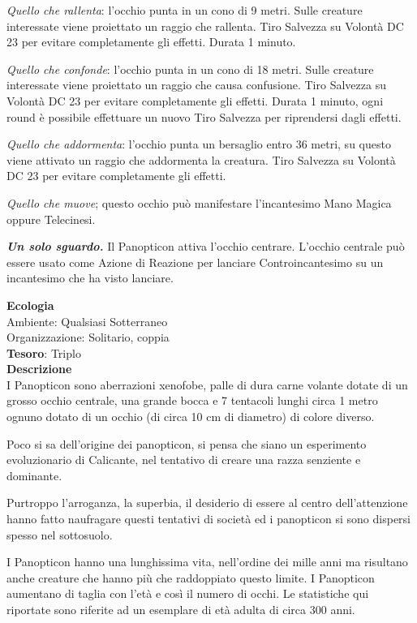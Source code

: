 \begin{multicols}{2}
\textit{Quello che rallenta}: l'occhio punta in un cono di 9 metri. Sulle creature interessate viene proiettato un raggio che rallenta. Tiro Salvezza su Volontà DC 23 per evitare completamente gli effetti. Durata 1 minuto.

\textit{Quello che confonde}: l'occhio punta in un cono di 18 metri. Sulle creature interessate viene proiettato un raggio che causa confusione. Tiro Salvezza su Volontà DC 23 per evitare completamente gli effetti. Durata 1 minuto, ogni round è possibile effettuare un nuovo Tiro Salvezza per riprendersi dagli effetti.

\textit{Quello che addormenta}: l'occhio punta un bersaglio entro 36 metri, su questo viene attivato un raggio che addormenta la creatura. Tiro Salvezza su Volontà DC 23 per evitare completamente gli effetti.

\textit{Quello che muove}; questo occhio può manifestare l'incantesimo Mano Magica oppure Telecinesi.

\textit{\textbf{Un solo sguardo.}} Il Panopticon attiva l'occhio centrare. L'occhio centrale può essere usato come Azione di Reazione per lanciare Controincantesimo su un incantesimo che ha visto lanciare.

\textbf{Ecologia}\\
Ambiente: Qualsiasi Sotterraneo\\
Organizzazione: Solitario, coppia\\
\textbf{Tesoro}: Triplo\\
\textbf{Descrizione}\\
I Panopticon sono aberrazioni xenofobe, palle di dura carne volante dotate di un grosso occhio centrale, una grande bocca e 7 tentacoli lunghi circa 1 metro ognuno dotato di un occhio (di circa 10 cm di diametro) di colore diverso.

Poco si sa dell'origine dei panopticon, si pensa che siano un esperimento evoluzionario di Calicante, nel tentativo di creare una razza senziente e dominante.

Purtroppo l'arroganza, la superbia, il desiderio di essere al centro dell'attenzione hanno fatto naufragare questi tentativi di società ed i panopticon si sono dispersi spesso nel sottosuolo.

I Panopticon hanno una lunghissima vita, nell'ordine dei mille anni ma risultano anche creature che hanno più che raddoppiato questo limite. I Panopticon aumentano di taglia con l'età e così il numero di occhi. Le statistiche qui riportate sono riferite ad un esemplare di età adulta di circa 300 anni.



\end{multicols}
